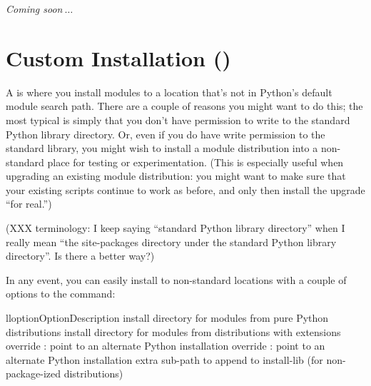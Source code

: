 \documentclass{howto}
\newcommand{\command}[1]{\code{#1}}
\newcommand{\option}[1]{\textsf{\small{#1}}}
\newcommand{\comingsoon}{\emph{Coming soon$\ \ldots$}}
\begin{document}
\comingsoon


\section{Custom Installation (\UNIX)}
\label{sec:custom-install-unix}


A  is where you install modules to a location
that's not in Python's default module search path.  There are a couple
of reasons you might want to do this; the most typical is simply that
you don't have permission to write to the standard Python library
directory.  Or, even if you do have write permission to the standard
library, you might wish to install a module distribution into a
non-standard place for testing or experimentation.  (This is especially
useful when upgrading an existing module distribution: you might want to
make sure that your existing scripts continue to work as before, and
only then install the upgrade ``for real.'')

(XXX terminology: I keep saying ``standard Python library directory''
when I really mean ``the site-packages directory under the standard
Python library directory''.  Is there a better way?)

In any event, you can easily install to non-standard locations with a
couple of options to the \command{install} command:

\begin{tableii}{ll}{option}{Option}{Description}
          {install directory for modules from pure Python distributions}
          {install directory for modules from distributions with extensions}
          {override :
           point to an alternate Python installation}
          {override :
           point to an alternate Python installation}
          {extra sub-path to append to \option{install-lib} (for
           non-package-ized distributions)}
\end{tableii}
\end{document}
